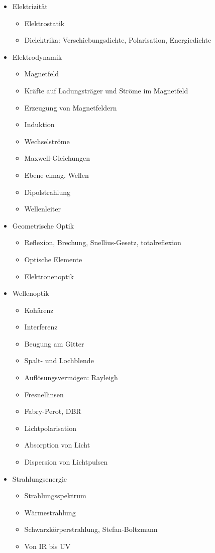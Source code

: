 \documentclass[12pt,twoside,fleqn,a4paper]{article}
\begin{document}
\begin{itemize}
\setlength\itemsep{0cm}
\item Elektrizität
\begin{itemize}
\item Elektrostatik
\item Dielektrika: Verschiebungsdichte, Polarisation, Energiedichte
\end{itemize}

\item Elektrodynamik
\begin{itemize}
\item Magnetfeld
\item Kräfte auf Ladungsträger und Ströme im Magnetfeld
\item Erzeugung von Magnetfeldern
\item Induktion
\item Wechselströme
\item Maxwell-Gleichungen
\item Ebene elmag. Wellen
\item Dipolstrahlung
\item Wellenleiter
\end{itemize}

\item Geometrische Optik
\begin{itemize}
\item Reflexion, Brechung, Snellius-Gesetz, totalreflexion
\item Optische Elemente
\item Elektronenoptik
\end{itemize}

\item Wellenoptik
\begin{itemize}
\item Kohärenz
\item Interferenz
\item Beugung am Gitter
\item Spalt- und Lochblende
\item Auflösungsvermögen: Rayleigh
\item Fresnellinsen
\item Fabry-Perot, DBR
\item Lichtpolarisation
\item Absorption von Licht
\item Dispersion von Lichtpulsen
\end{itemize}

\item Strahlungsenergie
\begin{itemize}
\item Strahlungsspektrum
\item Wärmestrahlung
\item Schwarzkörperstrahlung, Stefan-Boltzmann
\item Von IR bis UV
\end{itemize}
\end{itemize}
\end{document}
